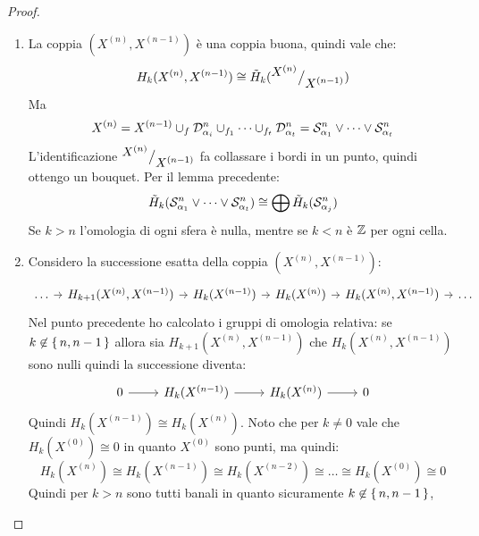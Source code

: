 \begin{proof}
  \begin{enumerate}
  \item
    La coppia $ (X^{(n)}, X^{(n-1)}) $ è una coppia buona, quindi vale che:
    \[
      H_k(X^{(n)}, X^{(n-1)}) \cong \tilde{H}_k({^{\textstyle X^{(n)}}\big/_{\textstyle X^{(n-1)}}})
    \]
    Ma
    \[
      X^{(n)} = X^{(n-1)} \cup_f \mathcal{D}^{n}_{\alpha_i} \cup_{f_1} \dots \cup_{f_t} \mathcal{D}^{n}_{\alpha_t} = \mathcal{S}^{n}_{\alpha_1} \vee \dots \vee \mathcal{S}^{n}_{\alpha_t}
    \]
    L'identificazione $ {^{\textstyle X^{(n)}}\big/_{\textstyle X^{(n-1)}}} $ fa collassare i bordi in un punto, quindi ottengo
    un bouquet.
    Per il lemma precedente:
    \[
      \tilde{H}_k(\mathcal{S}^{n}_{\alpha_1} \vee \dots \vee \mathcal{S}^{n}_{\alpha_t}) \cong \bigoplus \tilde{H}_k(\mathcal{S}^{n}_{\alpha_j})
    \]
    Se $ k > n $ l'omologia di ogni sfera è nulla, mentre
    se $ k < n $ è $ \mathbb{Z} $ per ogni cella.
  \item
    Considero la successione esatta della coppia $ (X^{(n)}, X^{(n-1)}) $:
    \[
      \begin{tikzcd}[nodes={column sep=7pt}]
        \dots \rar & H_{k+1}(X^{(n)}, X^{(n-1)}) \rar & H_k(X^{(n-1)}) \rar & H_k(X^{(n)}) \rar & H_{k}(X^{(n)}, X^{(n-1)}) \rar & \dots
      \end{tikzcd}
    \]
    Nel punto precedente ho calcolato i gruppi di omologia relativa:
    se $ k \not \in \set{n, n-1} $ allora sia
    $ H_{k+1}(X^{(n)}, X^{(n-1)}) $ che $ H_k(X^{(n)}, X^{(n-1)}) $ sono nulli
    quindi la successione diventa:
    \[
      \begin{tikzcd}
        0 \rar   & H_k(X^{(n-1)}) \rar  & H_k(X^{(n)}) \rar & 0
      \end{tikzcd}
    \]
    Quindi $ H_k(X^{(n-1)}) \cong H_k(X^{(n)}) $. Noto che per $ k \not = 0 $ vale che
    $ H_k(X^{(0)}) \cong 0 $ in quanto $ X^{(0)} $ sono punti,
    ma quindi:
    \[
      H_k(X^{(n)}) \cong  H_k(X^{(n-1)}) \cong H_k(X^{(n-2)}) \cong \dots \cong H_k(X^{(0)}) \cong 0
    \]
    Quindi per $ k > n $ sono tutti banali in quanto sicuramente $ k \not \in \set{n, n-1} $,


\end{enumerate}
\end{proof}
